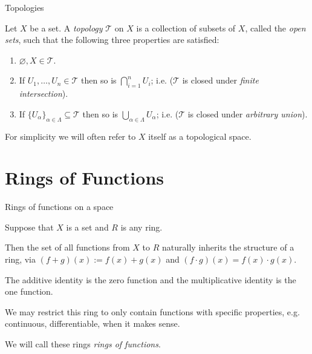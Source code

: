 \documentclass[aspectratio=169,10pt]{beamer}
\begin{document}
\begin{frame}{Topologies}
    \begin{definition}
        Let $X$ be a set. A \textit{topology} $\mathcal{T}$ on $X$ is a collection of subsets of $X$, called the \textit{open sets}, such that the following three properties are satisfied:
        
        \begin{enumerate}
            \item $\varnothing, X \in \mathcal{T}$.
            \item If $U_1, \dots, U_n \in \mathcal{T}$ then so is $\bigcap_{i=1}^{n} U_i$; i.e. ($\mathcal{T}$ is closed under \textit{finite intersection}).
            \item If $\{U_\alpha\}_{\alpha \in \Lambda} \subseteq \mathcal{T}$ then so is $\bigcup_{\alpha \in \Lambda} U_\alpha$; i.e. ($\mathcal{T}$ is closed under \textit{{\color{red}arbitrary} union}).
        \end{enumerate}
        For simplicity we will often refer to $X$ itself as a topological space.
    \end{definition}
\end{frame}

\section{Rings of Functions}

\begin{frame}{Rings of functions on a space}

Suppose that $X$ is a set and $R$ is any ring.
\vspace{12pt}

Then the set of all functions from $X$ to $R$ naturally inherits the structure of a ring, via $(f+g)(x) := f(x) +g(x)$ and $(f \cdot g)(x) = f(x)\cdot g(x)$.

The additive identity is the zero function and the multiplicative identity is the one function.
\vspace{12pt}

We may restrict this ring to only contain functions with specific properties, e.g. continuous, differentiable, when it makes sense.

We will call these rings \textit{rings of functions}.

\end{frame}
\end{document}
